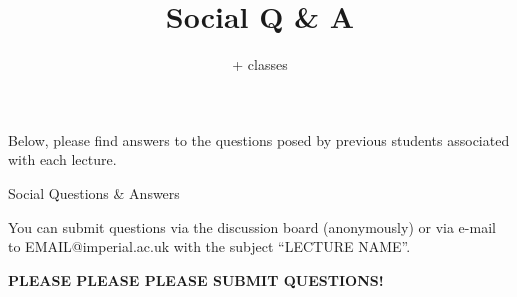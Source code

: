 \documentclass[a4paper,11pt]{book}
\title{\lecture Social Q \& A}
\author{\lecturer + \lecture classes}
\makeatletter
\newcommand{\lecture}{LECTURE NAME\xspace}
\newcommand{\qemail}{EMAIL@imperial.ac.uk\xspace}
\makeatother
\begin{document}
\maketitle

\noindent Below, please find answers to the questions posed by previous students associated with each lecture. \\

{\Large \bf \red

\begin{center}
Social Questions \& Answers \\
\end{center}

\vspace*{0.5cm}
You can submit questions via the discussion board (anonymously) or via e-mail to \qemail with the subject ``\lecture''.

\vspace*{0.5cm}
\begin{center}
{\bf \red PLEASE PLEASE PLEASE SUBMIT QUESTIONS!}
\end{center}}



\end{document}
